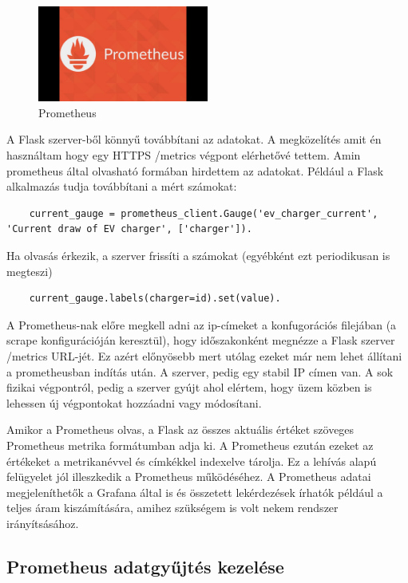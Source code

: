 \begin{figure}[!ht]
    \centering
    \includegraphics[width=0.5\textwidth, keepaspectratio]{figures/maxresdefault.jpg}
    \caption{Prometheus \cite{youtube:someid}} 
\end{figure}

A Flask szerver-ből könnyű továbbítani az adatokat. A megközelítés amit én használtam hogy egy HTTPS /metrics 
végpont elérhetővé tettem. Amin prometheus által olvasható formában hirdettem az adatokat. 
Például a Flask alkalmazás tudja továbbítani a mért számokat:
\begin{lstlisting}
    current_gauge = prometheus_client.Gauge('ev_charger_current', 'Current draw of EV charger', ['charger']). 
\end{lstlisting}

Ha olvasás érkezik, a szerver frissíti a számokat (egyébként ezt periodikusan is megteszi)
\begin{lstlisting}
    current_gauge.labels(charger=id).set(value). 
\end{lstlisting}

A Prometheus-nak előre megkell adni az ip-címeket a konfugorációs filejában
(a scrape konfigurációján keresztül), hogy időszakonként megnézze a Flask szerver 
/metrics URL-jét. 
Ez azért előnyösebb mert utólag ezeket már nem lehet állítani a prometheusban indítás után.
A szerver, pedig egy stabil IP címen van. A sok fizikai végpontról, pedig a szerver gyújt ahol elértem, hogy 
üzem közben is lehessen új végpontokat hozzáadni vagy módosítani.

Amikor a Prometheus olvas, a Flask az összes aktuális értéket szöveges 
Prometheus metrika formátumban adja ki. A Prometheus ezután ezeket az értékeket a metrikanévvel és címkékkel 
indexelve tárolja. Ez a lehívás alapú felügyelet jól illeszkedik a Prometheus működéséhez. 
A Prometheus adatai megjeleníthetők a Grafana által is és összetett lekérdezések írhatók 
például a teljes áram kiszámítására, amihez szükségem is volt nekem rendszer irányítsásához.

\subsection{Prometheus adatgyűjtés kezelése}

